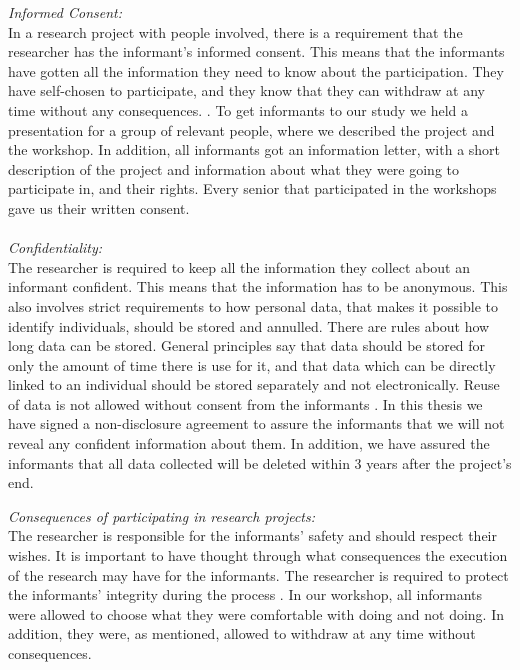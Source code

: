 \emph{Informed Consent:} \\
In a research project with people involved, there is a requirement that the researcher has the informant's informed consent. This means that the informants have gotten all the information they need to know about the participation. They have self-chosen to participate, and they know that they can withdraw at any time without any consequences.  \cite{qualitative}. To get informants to our study we held a presentation for a group of relevant people, where we described the project and the workshop. In addition, all informants got an information letter, with a short description of the project and information about what they were going to participate in, and their rights. Every senior that participated in the workshops gave us their written consent.   \\ \\
\emph{Confidentiality:}\\
The researcher is required to keep all the information they collect about an informant confident. This means that the information has to be anonymous. This also involves strict requirements to how personal data, that makes it possible to identify individuals, should be stored and annulled. There are rules about how long data can be stored. General principles say that data should be stored for only the amount of time there is use for it, and that data which can be directly linked to an individual should be stored separately and not electronically. Reuse of data is not allowed without consent from the informants \cite{qualitative}. In this thesis we have signed a non-disclosure agreement to assure the informants that we will not reveal any confident information about them. In addition, we have assured the informants that all data collected will be deleted within 3 years after the project's end.

\newpage
\emph{Consequences of participating in research projects:}\\
The researcher is responsible for the informants' safety and should respect their wishes. It is important to have thought through what consequences the execution of the research may have for the informants. The researcher is required to protect the informants' integrity during the process \cite{qualitative}. In our workshop, all informants were allowed to choose what they were comfortable with doing and not doing. In addition, they were, as mentioned, allowed to withdraw at any time without consequences. \\ \\

